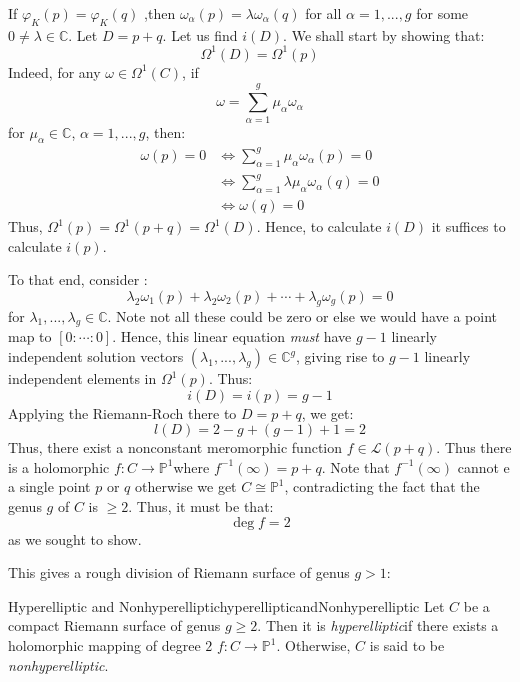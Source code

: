 \documentclass{book}
\newcommand{\C}{{\mathbb{C}}}
\renewcommand{\P}{{\mathbb{P}}}
\newcommand{\CL}{{\mathcal{L}}}
\newcommand{\LRw}{\Leftrightarrow}
\let\temp\phi
\let\phi\varphi
\let\varphi\temp
\begin{document}
\begin{Proof}
  If $\phi_K(p)  = \phi_K(q)$ ,then $\omega_\alpha(p) = \lambda\omega_\alpha(q)$ for all $\alpha = 1,..., g$
  for some $0 \ne \lambda  \in \C$. Let $D = p+q$. Let us find $i(D)$. We shall start by showing that:
  \[
    \Omega^1(D)  = \Omega^1(p)
  \]
  Indeed, for any $\omega \in \Omega^1(C)$, if
  \[
    \omega = \sum_{\alpha=1}^g \mu_\alpha\omega_\alpha
  \]
  for $\mu_\alpha \in \C$, $\alpha = 1,..., g$, then:
  \begin{align*}
    \omega(p) = 0 &\LRw \sum_{\alpha=1}^g \mu_\alpha\omega_\alpha(p) = 0\\
      &\LRw \sum_{\alpha=1}^g \lambda\mu_\alpha\omega_\alpha(q) = 0\\
      &\LRw \omega(q) = 0
  \end{align*}
  Thus, $\Omega^1(p) = \Omega^1(p+q) = \Omega^1(D)$. Hence, to calculate $i(D)$ it suffices to calculate
  $i(p)$.

  To that end, consider :
  \[
    \lambda_2\omega_1(p) + \lambda_2\omega_2(p) + \cdots + \lambda_g\omega_g(p) = 0
  \]
  for $\lambda_1, ..., \lambda_g \in \C$. Note not all these could be zero or else we would have a point
  map to $[0:\cdots :0]$. Hence, this linear equation \emph{must} have $g-1$ linearly independent
  solution vectors $(\lambda_1, ..., \lambda_g) \in \C^g$, giving rise to $g-1$ linearly independent
  elements in $\Omega^1(p)$. Thus:
  \[
    i(D) = i(p) = g-1
  \]
  Applying the Riemann-Roch there to $D = p+q$, we get:
  \[
    l(D) = 2-g+(g-1)+1 = 2
  \]
  Thus, there exist a  nonconstant meromorphic function $f \in \CL(p+q)$. Thus there is a holomorphic $f: C
  \to \P^1$where $f^{-1}(\infty) = p+q$. Note that $f^{-1}(\infty)$ cannot e a single point $p$ or
  $q$ otherwise we get $C \cong \P^1$, contradicting the fact that the genus $g$ of $C$ is $\ge 2$. Thus,
  it must be that:
  \[
    \deg f = 2
  \]
  as we sought to show.
\end{Proof}

This gives a rough division of Riemann surface of genus $g> 1$:

\begin{defn}{Hyperelliptic and Nonhyperelliptic}{hyperellipticandNonhyperelliptic}
  Let $C$ be a compact Riemann surface of genus $g \ge 2$. Then it is \emph{hyperelliptic}if there
  exists a holomorphic mapping of degree $2$ $f: C \to \P^1$. Otherwise, $C$ is said to be
  \emph{nonhyperelliptic}.
\end{defn}
\end{document}
